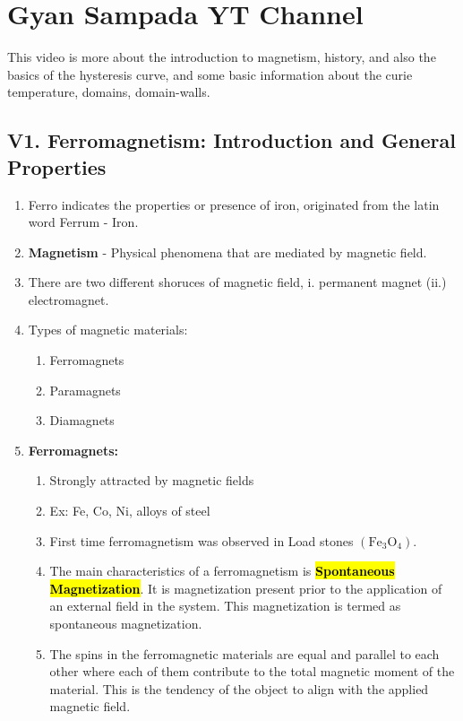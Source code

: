 \section{Gyan Sampada YT Channel}

This video is more about the introduction to magnetism, history, and also the basics of the hysteresis curve, and some basic information about the curie temperature, domains, domain-walls. 
\subsection*{V1. Ferromagnetism: Introduction and General Properties}

\begin{enumerate}
    \item Ferro indicates the properties or presence of iron, originated from the latin word Ferrum - Iron.
    \item \textbf{Magnetism} - Physical phenomena that are mediated by magnetic field.
    \item There are two different shoruces of magnetic field, i. permanent magnet (ii.) electromagnet.
    \item Types of magnetic materials:
    \begin{enumerate}
        \item Ferromagnets
        \item Paramagnets
        \item Diamagnets
    \end{enumerate}
    \item \textbf{Ferromagnets:}
    \begin{enumerate}
        \item Strongly attracted by magnetic fields
        \item Ex: Fe, Co, Ni, alloys of steel
        \item First time ferromagnetism was observed in Load stones $(\mathrm{Fe_3O_4})$.
        \item The main characteristics of a ferromagnetism is \hl{\textbf{Spontaneous Magnetization}}. It is magnetization present prior to the application of an external field in the system. This magnetization is termed as spontaneous magnetization.   
        \item The spins in the ferromagnetic materials are equal and parallel to each other where each of them contribute to the total magnetic moment of the material. This is the tendency of the object to align with the applied magnetic field.

\end{enumerate}
\end{enumerate}
